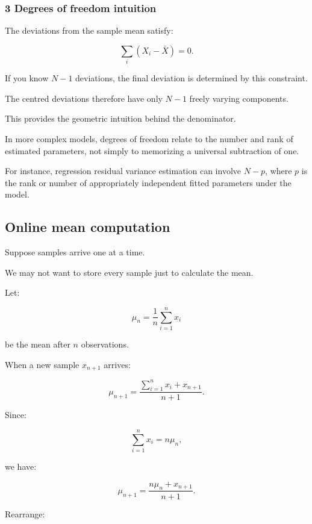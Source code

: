 \subsubsection{3 Degrees of freedom intuition}\label{02-foundations-ii-ch030-degrees-of-freedom-intuition}

\hypertarget{02-foundations-ii-ch030-degrees-of-freedom-intuition}{}

The deviations from the sample mean satisfy:

\[
 \sum_i(X_i-\bar X)=0.
\]

If you know \(N-1\) deviations, the final deviation is determined by this constraint.

The centred deviations therefore have only \(N-1\) freely varying components.

This provides the geometric intuition behind the denominator.

In more complex models, degrees of freedom relate to the number and rank of estimated parameters, not simply to memorizing a universal subtraction of one.

For instance, regression residual variance estimation can involve \(N-p\), where \(p\) is the rank or number of appropriately independent fitted parameters under the model.

\subsection{Online mean computation}\label{02-foundations-ii-ch030-online-mean-computation}

\hypertarget{02-foundations-ii-ch030-online-mean-computation}{}

Suppose samples arrive one at a time.

We may not want to store every sample just to calculate the mean.

Let:

\[
 \mu_n= \frac1n\sum_{i=1}^{n}x_i
\]

be the mean after \(n\) observations.

When a new sample \(x_{n+1}\) arrives:

\[
 \mu_{n+1} = \frac{ \sum_{i=1}^{n}x_i+x_{n+1} }{ n+1 }.
\]

Since:

\[
 \sum_{i=1}^{n}x_i=n\mu_n,
\]

we have:

\[
 \mu_{n+1} = \frac{n\mu_n+x_{n+1}}{n+1}.
\]

Rearrange:


